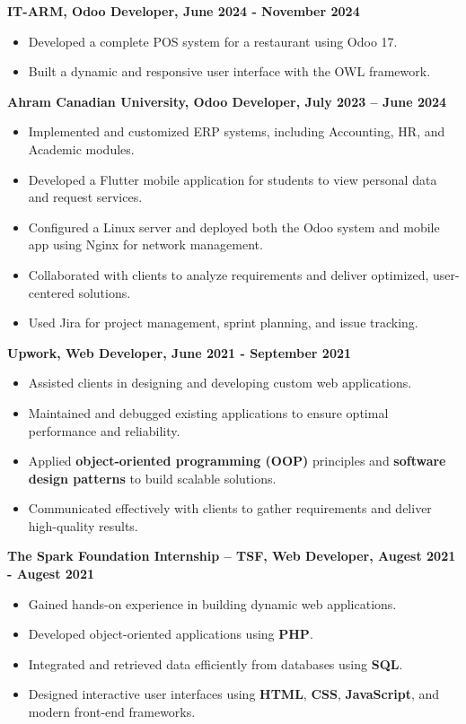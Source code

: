 \documentclass[a4paper,12pt]{article}
\begin{document}
\noindent\textbf{IT-ARM, Odoo Developer, June 2024 - November 2024}\\[-1.2em]
\begin{itemize}[nosep]
    \item Developed a complete POS system for a restaurant using Odoo 17.
    \item Built a dynamic and responsive user interface with the OWL framework.
\end{itemize}

\noindent\textbf{Ahram Canadian University, Odoo Developer, July 2023 – June 2024}\\[-1.2em]
\begin{itemize}[nosep]
    \item Implemented and customized ERP systems, including Accounting, HR, and Academic modules.
    \item Developed a Flutter mobile application for students to view personal data and request services.
    \item Configured a Linux server and deployed both the Odoo system and mobile app using Nginx for network management.
    \item Collaborated with clients to analyze requirements and deliver optimized, user-centered solutions.
    \item Used Jira for project management, sprint planning, and issue tracking.
\end{itemize}

\noindent\textbf{Upwork, Web Developer, June 2021 - September 2021 }\\[-1.2em]
\begin{itemize}[nosep]
    \item Assisted clients in designing and developing custom web applications.
    \item Maintained and debugged existing applications to ensure optimal performance and reliability.
    \item Applied \textbf{object-oriented programming (OOP)} principles and \textbf{software design patterns} to build scalable solutions.
    \item Communicated effectively with clients to gather requirements and deliver high-quality results.
\end{itemize}

\noindent\textbf{The Spark Foundation Internship – TSF, Web Developer, Augest 2021 - Augest 2021 }\\[-1.2em]
\begin{itemize}[nosep]
  \item Gained hands-on experience in building dynamic web applications.
    \item Developed object-oriented applications using \textbf{PHP}.
    \item Integrated and retrieved data efficiently from databases using \textbf{SQL}.
    \item Designed interactive user interfaces using \textbf{HTML}, \textbf{CSS}, \textbf{JavaScript}, and modern front-end frameworks.
\end{itemize}
\end{document}
